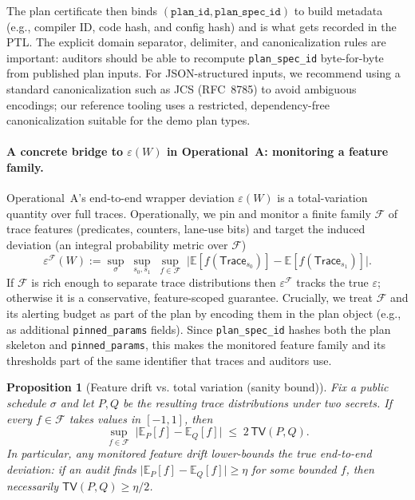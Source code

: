 \documentclass[11pt]{article}
\newtheorem{proposition}{Proposition}
\newcommand{\tv}{\ensuremath{\mathsf{TV}}}
\begin{document}
The plan certificate then binds $(\texttt{plan\_id},\texttt{plan\_spec\_id})$ to build metadata (e.g., compiler ID, code hash, and config hash) and is what gets recorded in the PTL.
The explicit domain separator, delimiter, and canonicalization rules are important: auditors should be able to recompute \texttt{plan\_spec\_id} byte-for-byte from published plan inputs.
For JSON-structured inputs, we recommend using a standard canonicalization such as JCS (RFC~8785) to avoid ambiguous encodings; our reference tooling uses a restricted, dependency-free canonicalization suitable for the demo plan types.\cite{rfc8785}

\paragraph{A concrete bridge to $\varepsilon(W)$ in Operational~A: monitoring a feature family.}
Operational~A's end-to-end wrapper deviation $\varepsilon(W)$ is a total-variation quantity over full traces.
Operationally, we pin and monitor a finite family $\mathcal{F}$ of trace features (predicates, counters, lane-use bits) and target the induced deviation (an integral probability metric over $\mathcal{F}$)\cite{sriperumbudurIPM2012}
\[\varepsilon^{\mathcal{F}}(W) := \sup_{\sigma}\;\sup_{s_0,s_1}\;\sup_{f\in\mathcal{F}}\;\big|\mathbb{E}[f(\mathsf{Trace}_{s_0})]-\mathbb{E}[f(\mathsf{Trace}_{s_1})]\big|.\]
If $\mathcal{F}$ is rich enough to separate trace distributions then $\varepsilon^{\mathcal{F}}$ tracks the true $\varepsilon$; otherwise it is a conservative, feature-scoped guarantee.
Crucially, we treat $\mathcal{F}$ and its alerting budget as part of the plan by encoding them in the plan object (e.g., as additional \texttt{pinned\_params} fields). Since \texttt{plan\_spec\_id} hashes both the plan skeleton and \texttt{pinned\_params}, this makes the monitored feature family and its thresholds part of the same identifier that traces and auditors use.

\begin{proposition}[Feature drift vs. total variation (sanity bound)]
Fix a public schedule $\sigma$ and let $P,Q$ be the resulting trace distributions under two secrets.
If every $f\in\mathcal{F}$ takes values in $[-1,1]$, then
\[\sup_{f\in\mathcal{F}}\;\big|\mathbb{E}_P[f]-\mathbb{E}_Q[f]\big| \;\le\; 2\,\tv(P,Q).\]
In particular, any monitored feature drift lower-bounds the true end-to-end deviation: if an audit finds
$\big|\mathbb{E}_P[f]-\mathbb{E}_Q[f]\big|\ge \eta$ for some bounded $f$, then necessarily $\tv(P,Q)\ge \eta/2$.
\end{proposition}
\end{document}
